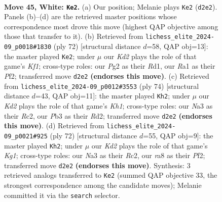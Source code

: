 \documentclass[11pt]{article}
\begin{document}
\clearpage

\begin{figure}[p]\centering
\begin{subfigure}{0.46\textwidth}\centering
\resizebox{\linewidth}{!}{%
\newchessgame
\chessboard[
  setfen={r4k2/2r2p1p/1n4p1/p3p1P1/P3P3/NP4RP/3K2P1/R7 w - - 4 45},
  showmover=false,
  pgfstyle=straightmove, color=movearrow, markmove={d2-e2}
]}
\caption{}
\end{subfigure}\hfill
\begin{subfigure}{0.46\textwidth}\centering
\resizebox{\linewidth}{!}{%
\newchessgame
\chessboard[
  setfen={8/2r1k1p1/1r2pp1p/pp6/3R1P2/P1P5/1P3PP1/3R1K2 w - - 1 37},
  showmover=false,
  pgfstyle=straightmove, color=movearrow, markmove={f1-e2}
]}
\caption{}
\end{subfigure}
\\[4pt]
\begin{subfigure}{0.46\textwidth}\centering
\resizebox{\linewidth}{!}{%
\newchessgame
\chessboard[
  setfen={1r2b3/1r4p1/2p2p1k/2P1pP2/2B1P2p/7P/1PRR2P1/7K w - - 2 38},
  showmover=false,
  pgfstyle=straightmove, color=movearrow, markmove={h1-h2}
]}
\caption{}
\end{subfigure}\hfill
\begin{subfigure}{0.46\textwidth}\centering
\resizebox{\linewidth}{!}{%
\newchessgame
\chessboard[
  setfen={r5k1/6p1/3r3p/4R3/1p4P1/1P2Pp1P/P1R2P2/6K1 w - - 1 37},
  showmover=false,
  pgfstyle=straightmove, color=movearrow, markmove={g1-h2}
]}
\caption{}
\end{subfigure}
\caption{\textbf{Move 45, White: \texttt{Ke2}.} (a) Our position; Melanie plays \texttt{Ke2} (\texttt{d2e2}). Panels (b)--(d) are the retrieved master positions whose correspondence most drove this move (highest QAP objective among those that transfer to it). (b) Retrieved from \texttt{lichess\_elite\_2024-09\_p0018\#1830} (ply 72) [structural distance $d$=58, QAP obj=13]: the master played \texttt{Ke2}; under $\mu$ our \emph{Kd2} plays the role of that game's \emph{Kf1}; cross-type roles: our \emph{P}g2 as their \emph{R}d1, our \emph{R}a1 as their \emph{P}f2; transferred move \texttt{d2e2} \textbf{(endorses this move)}. (c) Retrieved from \texttt{lichess\_elite\_2024-09\_p0012\#3553} (ply 74) [structural distance $d$=43, QAP obj=11]: the master played \texttt{Kh2}; under $\mu$ our \emph{Kd2} plays the role of that game's \emph{Kh1}; cross-type roles: our \emph{N}a3 as their \emph{R}c2, our \emph{P}b3 as their \emph{R}d2; transferred move \texttt{d2e2} \textbf{(endorses this move)}. (d) Retrieved from \texttt{lichess\_elite\_2024-09\_p0021\#925} (ply 72) [structural distance $d$=55, QAP obj=9]: the master played \texttt{Kh2}; under $\mu$ our \emph{Kd2} plays the role of that game's \emph{Kg1}; cross-type roles: our \emph{N}a3 as their \emph{R}c2, our \emph{r}a8 as their \emph{P}f2; transferred move \texttt{d2e2} \textbf{(endorses this move)}. Synthesis: 3 retrieved analogs transferred to \texttt{Ke2} (summed QAP objective 33, the strongest correspondence among the candidate moves); Melanie committed it via the \texttt{search} selector.}
\label{fig:thought-m88}
\end{figure}
\end{document}
